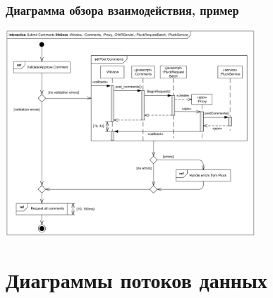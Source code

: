\documentclass{../mcsslides}
\begin{document}
    \begin{frame}
        \frametitle{Диаграмма обзора взаимодействия, пример}
        \begin{center}
            \includegraphics[width=0.7\textwidth]{interactionOverviewExample.png}
        \end{center}
    \end{frame}

    \section{Диаграммы потоков данных}
\end{document}
